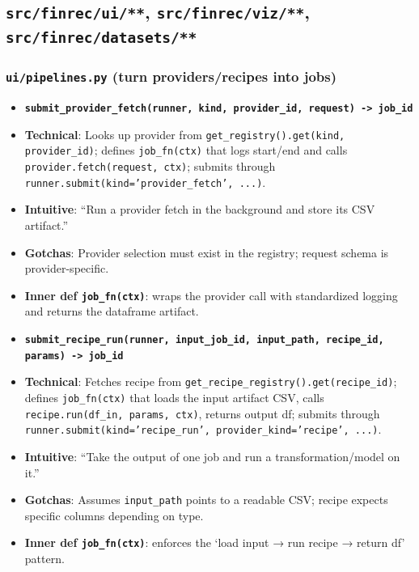 \documentclass[11pt]{article}
\begin{document}
\subsection{\texttt{src/finrec/ui/**}, \texttt{src/finrec/viz/**}, \texttt{src/finrec/datasets/**}}


\subsubsection{\texttt{ui/pipelines.py} (turn providers/recipes into jobs)}

\begin{itemize}[leftmargin=*,nosep]
\item \textbf{\texttt{submit\_provider\_fetch(runner, kind, provider\_id, request) -> job\_id}}
\item \textbf{Technical}: Looks up provider from \texttt{get\_registry().get(kind, provider\_id)}; defines \texttt{job\_fn(ctx)} that logs start/end and calls \texttt{provider.fetch(request, ctx)}; submits through \texttt{runner.submit(kind='provider\_fetch', ...)}.
\item \textbf{Intuitive}: “Run a provider fetch in the background and store its CSV artifact.”
\item \textbf{Gotchas}: Provider selection must exist in the registry; request schema is provider-specific.
\item \textbf{Inner def \texttt{job\_fn(ctx)}}: wraps the provider call with standardized logging and returns the dataframe artifact.
\end{itemize}


\begin{itemize}[leftmargin=*,nosep]
\item \textbf{\texttt{submit\_recipe\_run(runner, input\_job\_id, input\_path, recipe\_id, params) -> job\_id}}
\item \textbf{Technical}: Fetches recipe from \texttt{get\_recipe\_registry().get(recipe\_id)}; defines \texttt{job\_fn(ctx)} that loads the input artifact CSV, calls \texttt{recipe.run(df\_in, params, ctx)}, returns output df; submits through \texttt{runner.submit(kind='recipe\_run', provider\_kind='recipe', ...)}.
\item \textbf{Intuitive}: “Take the output of one job and run a transformation/model on it.”
\item \textbf{Gotchas}: Assumes \texttt{input\_path} points to a readable CSV; recipe expects specific columns depending on type.
\item \textbf{Inner def \texttt{job\_fn(ctx)}}: enforces the ‘load input → run recipe → return df’ pattern.
\end{itemize}
\end{document}
